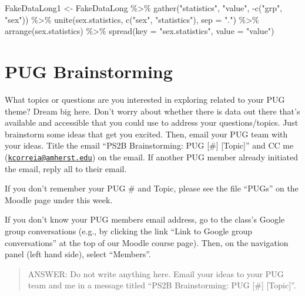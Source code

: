\documentclass[
]{article}
\newenvironment{Shaded}{\begin{snugshade}}{\end{snugshade}}
\newcommand{\AttributeTok}[1]{\textcolor[rgb]{0.77,0.63,0.00}{#1}}
\newcommand{\FunctionTok}[1]{\textcolor[rgb]{0.00,0.00,0.00}{#1}}
\newcommand{\NormalTok}[1]{#1}
\newcommand{\OtherTok}[1]{\textcolor[rgb]{0.56,0.35,0.01}{#1}}
\newcommand{\SpecialCharTok}[1]{\textcolor[rgb]{0.00,0.00,0.00}{#1}}
\newcommand{\StringTok}[1]{\textcolor[rgb]{0.31,0.60,0.02}{#1}}
\begin{document}
\begin{Shaded}
\begin{Highlighting}[]
\NormalTok{FakeDataLong1 }\OtherTok{\textless{}{-}}\NormalTok{ FakeDataLong }\SpecialCharTok{\%\textgreater{}\%}
\FunctionTok{gather}\NormalTok{(}\StringTok{"statistics"}\NormalTok{, }\StringTok{"value"}\NormalTok{, }\SpecialCharTok{{-}}\FunctionTok{c}\NormalTok{(}\StringTok{"grp"}\NormalTok{, }\StringTok{"sex"}\NormalTok{)) }\SpecialCharTok{\%\textgreater{}\%}
\FunctionTok{unite}\NormalTok{(sex.statistics, }\FunctionTok{c}\NormalTok{(}\StringTok{"sex"}\NormalTok{, }\StringTok{"statistics"}\NormalTok{), }\AttributeTok{sep =} \StringTok{"."}\NormalTok{) }\SpecialCharTok{\%\textgreater{}\%}
\FunctionTok{arrange}\NormalTok{(sex.statistics) }\SpecialCharTok{\%\textgreater{}\%}
\FunctionTok{spread}\NormalTok{(}\AttributeTok{key =} \StringTok{"sex.statistics"}\NormalTok{, }\AttributeTok{value =} \StringTok{"value"}\NormalTok{)}
\end{Highlighting}
\end{Shaded}

\newpage

\hypertarget{pug-brainstorming}{%
\section{PUG Brainstorming}\label{pug-brainstorming}}

What topics or questions are you interested in exploring related to your
PUG theme? Dream big here. Don't worry about whether there is data out
there that's available and accessible that you could use to address your
questions/topics. Just brainstorm some ideas that get you excited. Then,
email your PUG team with your ideas. Title the email ``PS2B
Brainstorming: PUG {[}\#{]} {[}Topic{]}'' and CC me
(\href{mailto:kcorreia@amherst.edu}{\nolinkurl{kcorreia@amherst.edu}})
on the email. If another PUG member already initiated the email, reply
all to their email.

If you don't remember your PUG \# and Topic, please see the file
``PUGs'' on the Moodle page under this week.

If you don't know your PUG members email address, go to the class's
Google group conversations (e.g., by clicking the link ``Link to Google
group conversations'' at the top of our Moodle course page). Then, on
the navigation panel (left hand side), select ``Members''.

\begin{quote}
ANSWER: Do not write anything here. Email your ideas to your PUG team
and me in a message titled ``PS2B Brainstorming: PUG {[}\#{]}
{[}Topic{]}''.
\end{quote}
\end{document}
